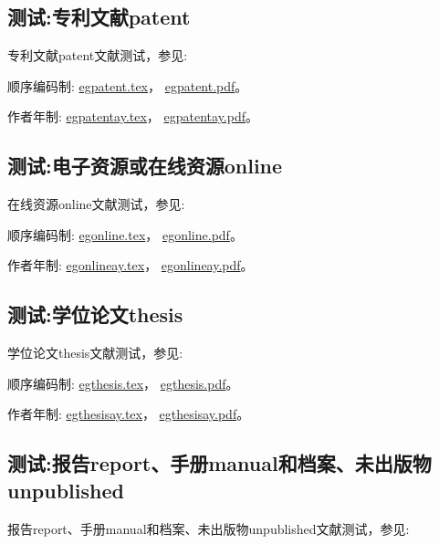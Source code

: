 \subsection{测试:专利文献patent}
专利文献patent文献测试，参见:

顺序编码制:
\href{run:./egpatent.tex}{egpatent.tex}，
\href{run:./egpatent.pdf}{egpatent.pdf}。

作者年制:
\href{run:./egpatentay.tex}{egpatentay.tex}，
\href{run:./egpatentay.pdf}{egpatentay.pdf}。


\subsection{测试:电子资源或在线资源online}
在线资源online文献测试，参见:

顺序编码制:
\href{run:./egonline.tex}{egonline.tex}，
\href{run:./egonline.pdf}{egonline.pdf}。

作者年制:
\href{run:./egonlineay.tex}{egonlineay.tex}，
\href{run:./egonlineay.pdf}{egonlineay.pdf}。



\subsection{测试:学位论文thesis}
学位论文thesis文献测试，参见:

顺序编码制:
\href{run:./egthesis.tex}{egthesis.tex}，
\href{run:./egthesis.pdf}{egthesis.pdf}。

作者年制:
\href{run:./egthesisay.tex}{egthesisay.tex}，
\href{run:./egthesisay.pdf}{egthesisay.pdf}。


\subsection{测试:报告report、手册manual和档案、未出版物unpublished}
报告report、手册manual和档案、未出版物unpublished文献测试，参见:

